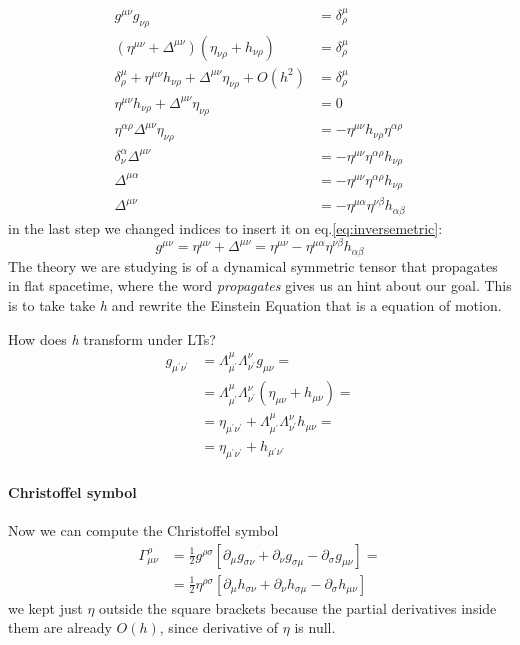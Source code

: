 \begin{align}
	g^{\mu \nu }g_{\nu \rho } &= \delta ^{\mu }_{\rho }\\
	\left( \eta ^{\mu \nu } +\Delta ^{\mu \nu } \right)\left( \eta _{\nu \rho }+h_{\nu \rho } \right) &= \delta ^{\mu }_{\rho }\\
	\delta ^{\mu }_{\rho } + \eta ^{\mu \nu }h_{\nu \rho } + \Delta ^{\mu \nu }\eta _{\nu \rho } + O\left( h^{2} \right) &= \delta ^{\mu }_{\rho } \\
	\eta ^{\mu \nu }h_{\nu \rho } + \Delta ^{\mu \nu }\eta _{\nu \rho } & = 0 \\
	\eta ^{\alpha \rho }\Delta ^{\mu \nu }\eta _{\nu \rho } & = - \eta ^{\mu \nu }h_{\nu \rho }\eta ^{\alpha \rho } \\
	\delta ^{\alpha }_{\nu }\Delta ^{\mu \nu } &= - \eta ^{\mu \nu }\eta ^{\alpha \rho }h_{\nu \rho } \\
	\Delta ^{\mu \alpha } &= -\eta ^{\mu \nu }\eta ^{\alpha \rho }h_{\nu \rho } \\
	\Delta ^{\mu \nu } &= -\eta ^{\mu \alpha }\eta ^{\nu \beta }h_{\alpha \beta }
\end{align}
in the last step we changed indices to insert it on eq.\ref{eq:inversemetric}:
\begin{equation}
g^{\mu \nu } = \eta ^{\mu \nu } + \Delta^{\mu \nu } = \eta ^{\mu \nu }- \eta ^{\mu \alpha }\eta ^{\nu \beta }h_{\alpha \beta }
\end{equation}
The theory we are studying is of a dynamical symmetric tensor that propagates in flat spacetime, where the word \emph{propagates} gives us an hint about our goal. This is to take take \emph{h} and rewrite the Einstein Equation that is a equation of motion. \par
How does \emph{h} transform under LTs?
\begin{align}
	g_{\mu ^{\prime }\nu ^{\prime }} &= \Lambda ^{\mu }_{\mu ^{\prime }} \Lambda ^{\nu }_{\nu ^{\prime }}g_{\mu \nu } = \\
	&= \Lambda ^{\mu }_{\mu ^{\prime }}\Lambda ^{\nu }_{\nu ^{\prime }}\left( \eta _{\mu \nu }+h_{\mu \nu } \right) = \\
	&= \eta _{\mu ^{\prime }\nu ^{\prime }} + \Lambda ^{\mu }_{\mu ^{\prime }}\Lambda ^{\nu }_{\nu ^{\prime }}h_{\mu \nu } = \\
	&= \eta _{\mu ^{\prime }\nu ^{\prime }}+h_{\mu ^{\prime }\nu ^{\prime }}
\end{align}
\paragraph{Christoffel symbol}
Now we can compute the Christoffel symbol
\begin{align}
	\Gamma ^{\rho }_{\mu \nu } &= \frac{1}{2} g^{\rho \sigma }\left[ \partial_{\mu }g_{\sigma \nu } + \partial_{\nu }g_{\sigma \mu } - \partial_{\sigma }g_{\mu \nu } \right] =\\
	&= \frac{1}{2} \eta ^{\rho \sigma }\left[ \partial_{\mu }h_{\sigma \nu }+\partial_{\nu }h_{\sigma \mu } - \partial_{\sigma }h_{\mu \nu } \right]
\end{align}
we kept just $\eta $ outside the square brackets because the partial derivatives inside them are already $O\left( h \right)$, since derivative of $\eta $ is null.\par
